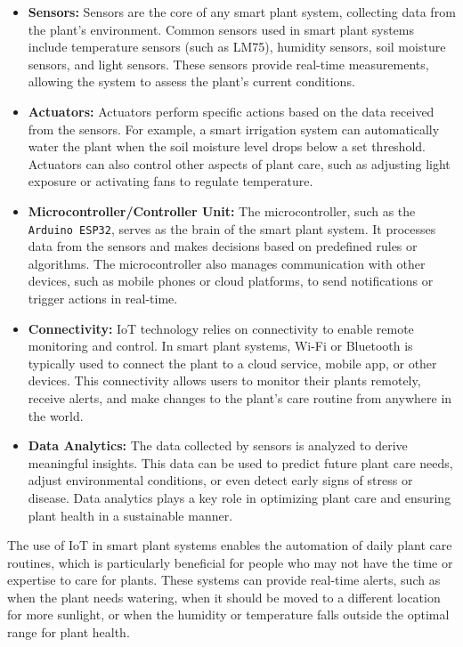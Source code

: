 \documentclass[12pt,a4paper,oneside,english]{book}
\begin{document}
\begin{itemize}
    \item \textbf{Sensors:} Sensors are the core of any smart plant system, collecting data from the plant's environment. Common sensors used in smart plant systems include temperature sensors (such as LM75), humidity sensors, soil moisture sensors, and light sensors. These sensors provide real-time measurements, allowing the system to assess the plant's current conditions.
    
    \item \textbf{Actuators:} Actuators perform specific actions based on the data received from the sensors. For example, a smart irrigation system can automatically water the plant when the soil moisture level drops below a set threshold. Actuators can also control other aspects of plant care, such as adjusting light exposure or activating fans to regulate temperature.
    
    \item \textbf{Microcontroller/Controller Unit:} The microcontroller, such as the \texttt{Arduino ESP32}, serves as the brain of the smart plant system. It processes data from the sensors and makes decisions based on predefined rules or algorithms. The microcontroller also manages communication with other devices, such as mobile phones or cloud platforms, to send notifications or trigger actions in real-time.
    
    \item \textbf{Connectivity:} IoT technology relies on connectivity to enable remote monitoring and control. In smart plant systems, Wi-Fi or Bluetooth is typically used to connect the plant to a cloud service, mobile app, or other devices. This connectivity allows users to monitor their plants remotely, receive alerts, and make changes to the plant's care routine from anywhere in the world.
    
    \item \textbf{Data Analytics:} The data collected by sensors is analyzed to derive meaningful insights. This data can be used to predict future plant care needs, adjust environmental conditions, or even detect early signs of stress or disease. Data analytics plays a key role in optimizing plant care and ensuring plant health in a sustainable manner.
\end{itemize}
The use of IoT in smart plant systems enables the automation of daily plant care routines, which is particularly beneficial for people who may not have the time or expertise to care for plants. These systems can provide real-time alerts, such as when the plant needs watering, when it should be moved to a different location for more sunlight, or when the humidity or temperature falls outside the optimal range for plant health.
\end{document}
